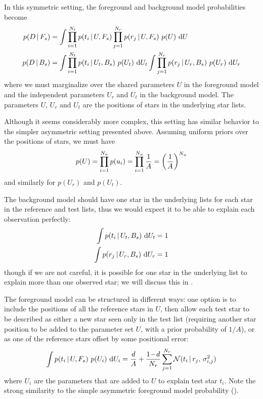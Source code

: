 In this symmetric setting, the foreground and background model
probabilities become
\begin{align}
  p(D \,\vert\, F_s) &=
  \int
  \prod_{i=1}^{{N_t}} p(t_i \,\vert\, U, F_s)
  \prod_{j=1}^{{N_r}} p(r_j \,\vert\, U, F_s)
  \ p(U)\  \mathrm{d} U \\
  p(D \,\vert\, B_s) &=
  \int
  \prod_{i=1}^{{N_t}} p(t_i \,\vert\, U_t, B_s)
  \ p(U_t) \ \mathrm{d} U_t
  \int
  \prod_{j=1}^{{N_r}} p(r_j \,\vert\, U_r, B_s)
  \ p(U_r) \ \mathrm{d} U_r
\end{align}
where we must marginalize over the shared parameters $U$ in the
foreground model and the independent parameters $U_r$ and $U_t$ in the
background model.  The parameters $U$, $U_r$ and $U_t$ are the
positions of stars in the underlying star lists.


Although it seems considerably more complex, this setting has similar
behavior to the simpler asymmetric setting presented above.  Assuming
uniform priors over the positions of stars, we must have
\begin{equation}
  p(U) = \prod_{i=1}^{{N_u}} p(u_i)
  = \prod_{i=1}^{{N_u}} \frac{1}{A} = \left( \frac{1}{A} \right)^{{N_u}}
\end{equation}
and similarly for $p(U_r)$ and $p(U_t)$.

The background model should have one star in the underlying lists for
each star in the reference and test lists, thus we would expect it to
be able to explain each observation perfectly:
\begin{align}
\int p(t_i \,\vert\, U_t, B_s) \ \mathrm{d} U_t &= 1 \\
\int p(r_j \,\vert\, U_r, B_s) \ \mathrm{d} U_r &= 1
\end{align}
though if we are not careful, it is possible for one star in the
underlying list to explain more than one observed star; we will
discuss this in .


The foreground model can be structured in different ways: one option
is to include the positions of all the reference stars in $U$, then
allow each test star to be described as either a new star seen only in
the test list (requiring another star position to be added to the
parameter set $U$, with a prior probability of $1/A$), or as one of
the reference stars offset by some positional error:
\begin{equation}
  \int p(t_i \,\vert\, U, F_s) \ p(U_i) \ \mathrm{d} U_i
  = \frac{d}{A} + \frac{1\!-\!d}{{N_r}} \sum_{j=1}^{N_r} \mathcal{N}(t_i \, | \, r_j,\, \sigma^2_{i,j})
\end{equation}
where $U_i$ are the parameters that are added to $U$ to explain test
star $t_i$.  Note the strong similarity to the simple asymmetric
foreground model probability ().


